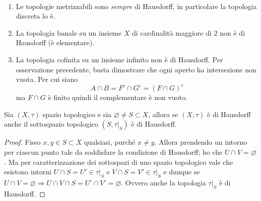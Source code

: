 \begin{example} \
\begin{enumerate}
	\item Le topologie metrizzabili sono \textit{sempre} di Hausdorff, in particolare la topologia discreta lo è. 
	\item La topologia banale su un insieme $X$ di cardinalità maggiore di $2$ non è di Hausdorff (è elementare). 
	\item La topologia cofinita su un insieme infinito non è di Hausdorff. Per osservazione precedente, basta dimostrare che ogni aperto ha intersezione non vuota. Per cui siano 
	\begin{equation*}
	A \cap B = F^c \cap G^c = (F \cap G)^c 
	\end{equation*}
	ma $F\cap G$ è finito quindi il complementare è non vuoto. 
\end{enumerate}
\end{example}

\begin{theorem}
	Sia $(X, \tau)$ spazio topologico e sia $\varnothing \neq S \subset X$, allora se $(X, \tau)$ è di Hausdorff anche il sottospazio topologico $(S, \tau|_S)$ è di Hausdorff. 
\end{theorem} 
\begin{proof}
	Fisso $x,y \in S \subset X$ qualsiasi, purché $x \neq y$. Allora prendendo un intorno per ciascun punto tale da soddisfare la condizione di Hausdorff; ho che $U \cap V = \varnothing$. Ma per caratterizzazione dei sottospazi di uno spazio topologico vale che esistono intorni $U \cap S = U' \in \tau|_S$ e $V \cap S = V' \in \tau|_S$ e dunque se $U \cap V = \varnothing \Longrightarrow U \cap V \cap S = U' \cap V' = \varnothing$. Ovvero anche la topologia $\tau|_S$ è di Hausdorff.
\end{proof}

